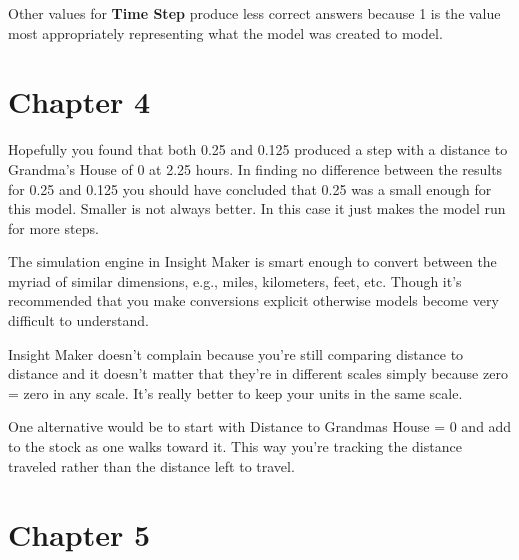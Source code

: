 \documentclass[]{memoir}
\renewcommand{\u}[1]{\textbf{#1}}
\begin{document}
Other values for \u{Time Step} produce less correct answers because 1 is
the value most appropriately representing what the model was created to
model.

\section{Chapter 4}


Hopefully you found that both 0.25 and 0.125 produced a step with a
distance to Grandma's House of 0 at 2.25 hours. In finding no difference
between the results for 0.25 and 0.125 you should have concluded that
0.25 was a small enough for this model. Smaller is not always better. In
this case it just makes the model run for more steps.


The simulation engine in Insight Maker is smart enough to convert
between the myriad of similar dimensions, e.g., miles, kilometers, feet,
etc. Though it's recommended that you make conversions explicit
otherwise models become very difficult to understand.

Insight Maker doesn't complain because you're still comparing distance
to distance and it doesn't matter that they're in different scales
simply because zero = zero in any scale. It's really better to keep your
units in the same scale.


One alternative would be to start with Distance to Grandmas House = 0
and add to the stock as one walks toward it. This way you're tracking
the distance traveled rather than the distance left to travel.

\section{Chapter 5}
\end{document}
